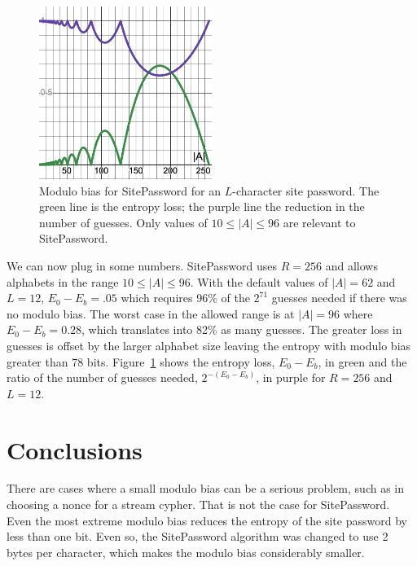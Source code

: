 \documentclass[11pt, oneside]{article}   	%
\begin{document}
\begin{figure}
    \centering
    \includegraphics[width=0.5\textwidth]{moduloBias.png} 
    \caption{Modulo bias for SitePassword for an $L$-character site password.  The green line is the entropy loss; the purple line the reduction in the number of guesses.  Only values of $10 \leq |A| \leq 96$ are relevant to SitePassword.}
    \label{fig}
\end{figure}

We can now plug in some numbers.  SitePassword uses $R = 256$ and allows alphabets in the range $10 \leq |A| \leq 96$.  With the default values of $|A| = 62$ and $L = 12$, $E_0 - E_b = .05$ which requires 96\% of the $2^{71}$ guesses needed if there was no modulo bias.  The worst case in the allowed range is at $|A| = 96$ where $E_0 - E_b = 0.28$, which translates into 82\% as many guesses.  The greater loss in guesses is offset by the larger alphabet size leaving the entropy with modulo bias greater than 78 bits.  Figure~\ref{fig} shows the entropy loss, $E_0 - E_b$, in green and the ratio of the number of guesses needed, $2^{-(E_0-E_b)}$, in purple for $R = 256$ and $L = 12$.

\section{Conclusions}

There are cases where a small modulo bias can be a serious problem, such as in choosing a nonce for a stream cypher.  That is not the case for SitePassword.  Even the most extreme modulo bias reduces the entropy of the site password by less than one bit.  Even so, the SitePassword algorithm was changed to use 2 bytes per character, which makes the modulo bias considerably smaller.
\end{document}
